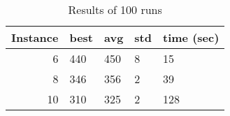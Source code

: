 \documentclass[12pt]{article}
\begin{document}
\begin{table}
\centering
\begin{tabular}{rllll} 
  \hline
  Instance & best & avg & std & time (sec) \\
  \hline \hline
  	6 & 440 & 450 & 8 & 15 \\
  \hline
	8 & 346 & 356 & 2 & 39 \\
  \hline
	10 & 310 & 325 & 2 & 128 \\
  \hline
\end{tabular}
\label{table:gammaSSE}
\caption{Results of 100 runs}
\end{table}
\end{document}
